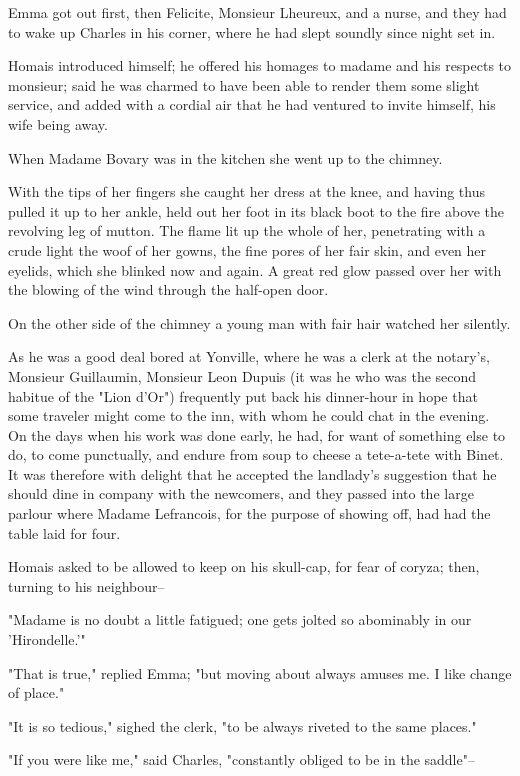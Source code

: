\documentclass{tufte-book}
\begin{document}
Emma got out first, then Felicite, Monsieur Lheureux, and a nurse, and
they had to wake up Charles in his corner, where he had slept soundly
since night set in.

Homais introduced himself; he offered his homages to madame and his
respects to monsieur; said he was charmed to have been able to render
them some slight service, and added with a cordial air that he had
ventured to invite himself, his wife being away.

When Madame Bovary was in the kitchen she went up to the chimney.

With the tips of her fingers she caught her dress at the knee, and
having thus pulled it up to her ankle, held out her foot in its black
boot to the fire above the revolving leg of mutton. The flame lit up the
whole of her, penetrating with a crude light the woof of her gowns, the
fine pores of her fair skin, and even her eyelids, which she blinked now
and again. A great red glow passed over her with the blowing of the wind
through the half-open door.

On the other side of the chimney a young man with fair hair watched her
silently.

As he was a good deal bored at Yonville, where he was a clerk at the
notary's, Monsieur Guillaumin, Monsieur Leon Dupuis (it was he who
was the second habitue of the "Lion d'Or") frequently put back his
dinner-hour in hope that some traveler might come to the inn, with whom
he could chat in the evening. On the days when his work was done early,
he had, for want of something else to do, to come punctually, and endure
from soup to cheese a tete-a-tete with Binet. It was therefore with
delight that he accepted the landlady's suggestion that he should dine
in company with the newcomers, and they passed into the large parlour
where Madame Lefrancois, for the purpose of showing off, had had the
table laid for four.

Homais asked to be allowed to keep on his skull-cap, for fear of coryza;
then, turning to his neighbour--

"Madame is no doubt a little fatigued; one gets jolted so abominably in
our 'Hirondelle.'"

"That is true," replied Emma; "but moving about always amuses me. I like
change of place."

"It is so tedious," sighed the clerk, "to be always riveted to the same
places."

"If you were like me," said Charles, "constantly obliged to be in the
saddle"--
\end{document}
